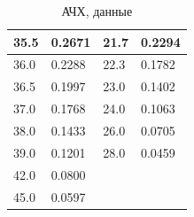 \documentclass[12pt, a4paper]{article}
\begin{document}
\begin{minipage}{0.45\linewidth}
\begin{table}[H]
\begin{tabular}{|ll|ll|}
      \multicolumn{1}{|l|}{35.5}              & 0.2671            & \multicolumn{1}{l|}{21.7}              & 0.2294            \\ \hline
      \multicolumn{1}{|l|}{36.0}              & 0.2288            & \multicolumn{1}{l|}{22.3}              & 0.1782            \\ \hline
      \multicolumn{1}{|l|}{36.5}              & 0.1997            & \multicolumn{1}{l|}{23.0}              & 0.1402            \\ \hline
      \multicolumn{1}{|l|}{37.0}              & 0.1768            & \multicolumn{1}{l|}{24.0}              & 0.1063            \\ \hline
      \multicolumn{1}{|l|}{38.0}              & 0.1433            & \multicolumn{1}{l|}{26.0}              & 0.0705            \\ \hline
      \multicolumn{1}{|l|}{39.0}              & 0.1201            & \multicolumn{1}{l|}{28.0}              & 0.0459            \\ \hline
      \multicolumn{1}{|l|}{42.0}              & 0.0800            & \multicolumn{2}{l|}{\multirow{2}{*}{}}                     \\ \cline{1-2}
      \multicolumn{1}{|l|}{45.0}              & 0.0597            & \multicolumn{2}{l|}{}                                      \\ \hline
    \end{tabular}
    \caption{АЧХ, данные}
  \end{table}
\end{minipage}
\end{document}
